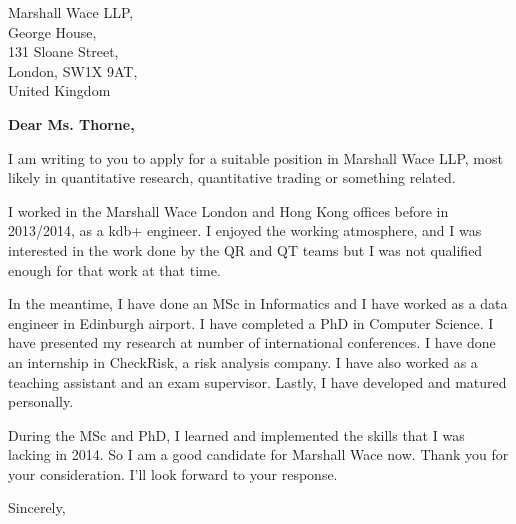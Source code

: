 \documentclass[11pt]{letter} %
\begin{document}

\begin{letter}{Marshall Wace LLP, \\
  George House, \\
  131 Sloane Street, \\
  London, SW1X 9AT, \\
  United Kingdom} %


  \opening{\textbf{Dear Ms. Thorne,}}

  I am writing to you to apply for a suitable position in Marshall Wace LLP, most likely in quantitative research, quantitative trading or something related.

  I worked in the Marshall Wace London and Hong Kong offices before in 2013/2014, as a kdb+ engineer. I enjoyed the working atmosphere, and I was interested in the work done by the QR and QT teams but I was not qualified enough for that work at that time.

  In the meantime, I have done an MSc in Informatics and I have worked as a data engineer in Edinburgh airport. I have completed a PhD in Computer Science. I have presented my research at number of international conferences. I have done an internship in CheckRisk, a risk analysis company. I have also worked as a teaching assistant and an exam supervisor. Lastly, I have developed and matured personally.

  During the MSc and PhD, I learned and implemented the skills that I was lacking in 2014. So I am a good candidate for Marshall Wace now. Thank you for your consideration. I'll look forward to your response.

  \vspace{2\parskip} %
  \closing{Sincerely,}
  \vspace{2\parskip} %




\end{letter}
\end{document}
